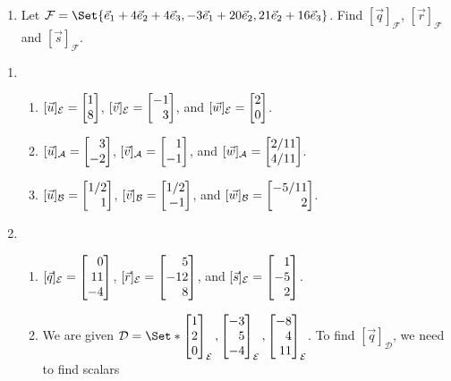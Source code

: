 \begin{exercises}
\begin{problist}
\begin{enumerate}
\begin{enumerate}
					\item Let $\mathcal F=\Set{\xhat+4\yhat+4\zhat,-3\xhat+20\yhat,21\yhat+16\zhat}$.
						Find $[\vec q]_{\mathcal F}$, $[\vec
						r]_{\mathcal F}$ and $[\vec s]_{\mathcal
						F}$.
				\end{enumerate}
		\end{enumerate}
		\begin{solution}
			\begin{enumerate}
				\item 
					\begin{enumerate}
						\item $[\vec{u}]_{\mathcal{E}} = \mat{1\\8}$,
							$[\vec{v}]_{\mathcal{E}} = \mat{-1\\3}$, and
							$[\vec{w}]_{\mathcal{E}} = \mat{2\\0}$.
						\item $[\vec{u}]_{\mathcal{A}} = \mat{3\\-2}$,
							$[\vec{v}]_{\mathcal{A}} = \mat{1\\-1}$, and
							$[\vec{w}]_{\mathcal{A}} = \mat{2/11\\4/11}$.
						\item $[\vec{u}]_{\mathcal{B}} = \mat{1/2\\1}$,
							$[\vec{v}]_{\mathcal{B}} = \mat{1/2\\-1}$, and
							$[\vec{w}]_{\mathcal{B}} = \mat{-5/11\\2}$.
					\end{enumerate}
				\item
					\begin{enumerate}
						\item $[\vec{q}]_{\mathcal{E}} = \mat{0\\11\\-4}$,
							$[\vec{r}]_{\mathcal{E}} = \mat{5\\-12 \\8}$, and
							$[\vec{s}]_{\mathcal{E}} = \mat{1\\-5\\2}$.
						\item We are given $\mathcal{D} = \Set*{\mat{1\\2\\0}_{\mathcal{E}}, \mat{-3\\5\\-4}_{\mathcal{E}}, 
							\mat{-8\\4\\11}_{\mathcal{E}}}$.
							To find $[\vec{q}]_{\mathcal{D}}$, we need to find scalars 

\end{enumerate}
\end{enumerate}
\end{solution}
\end{problist}
\end{exercises}
